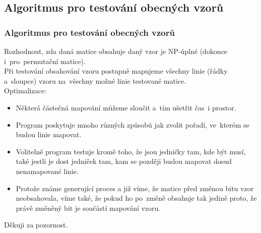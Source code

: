 \documentclass{beamer}
\begin{document}
\subsection{Algoritmus pro testování obecných vzorů}
\begin{frame}
\frametitle{Algoritmus pro testování obecných vzorů}
Rozhodnout, zda daná matice obsahuje daný vzor je NP-úplné (dokonce
i~pro~permutační matice).\\
\pause
\vspace{1em}
Při testování obsahování vzoru postupně mapujeme všechny linie (řádky a~sloupce) vzoru na~všechny možné linie testované matice.\\
\vspace{1em}
Optimalizace:
\begin{itemize}
\item Některá částečná mapování můžeme sloučit a~tím ušetřit čas~i prostor.
\pause
\item Program poskytuje mnoho různých způsobů jak zvolit pořadí, ve~kterém se budou linie mapovat.
\pause
\item Volitelně program testuje kromě toho, že jsou jedničky tam, kde být musí, také jestli je dost jedniček tam, kam se později budou mapovat dosud nenamapované linie.
\pause
\item Protože známe generující proces a již víme, že matice před změnou bitu vzor neobsahovala, víme také, že pokud ho po~změně obsahuje tak jedině proto, že právě změněný bit je součástí mapování vzoru.
\end{itemize}
\end{frame}


\begin{frame}
\centering
Děkuji za pozornost.
\end{frame}
\end{document}
